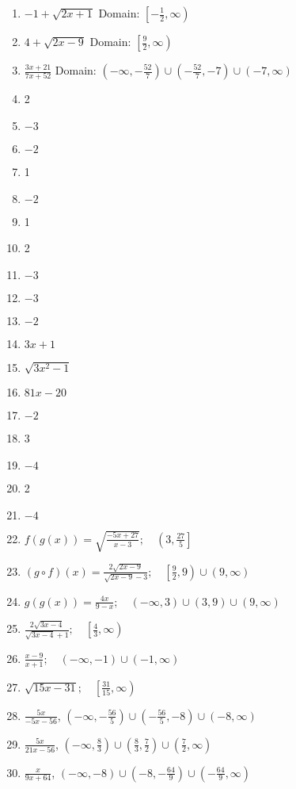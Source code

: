 \begin{enumerate}
	\item $-1 + \sqrt{2x+1}$ Domain: $\left[-\frac{1}{2}, \infty\right)$
	\item $4 + \sqrt{2x-9}$ Domain: $\left[\frac{9}{2}, \infty\right)$
	\item $\frac{3x+21}{7x+52}$ Domain: $\left(-\infty, -\frac{52}{7}\right) \cup \left(-\frac{52}{7}, -7\right) \cup (-7, \infty)$
	\item 2
     \item $-3$
     \item $-2$
     \item 1
     \item $-2$
     \item 1
     \item 2
     \item $-3$
     \item $-3$
     \item $-2$
     \item $3x + 1$
    \item $\sqrt{3x^2-1}$
    \item $81x-20$
    \item $-2$
    \item 3
    \item $-4$
    \item 2
    \item $-4$
    \item $f(g(x)) = \sqrt{\frac{-5x+27}{x-3}}; \quad \left(3, \frac{27}{5}\right]$
    \item $(g \circ f)(x) = \frac{2\sqrt{2x-9}}{\sqrt{2x-9}-3}; \quad \left[\frac{9}{2},9\right) \cup (9, \infty)$
    \item $g(g(x)) = \frac{4x}{9-x}; \quad (-\infty, 3) \cup (3, 9) \cup (9, \infty)$
    \item $\frac{2\sqrt{3x-4}}{\sqrt{3x-4}+1}; \quad  \left[\frac{4}{3}, \infty\right)$
    \item $\frac{x-9}{x+1}; \quad (-\infty, -1) \cup (-1, \infty)$
    \item $\sqrt{15x-31}; \quad \left[\frac{31}{15}, \infty\right)$
    \item $\frac{5x}{-5x-56}$, $\left(-\infty, -\frac{56}{5}\right) \cup \left(-\frac{56}{5}, -8\right) \cup (-8, \infty)$   \newline\\
	\item $\frac{5x}{21x-56}$, $\left(-\infty, \frac{8}{3}\right) \cup \left(\frac{8}{3}, \frac{7}{2}\right) \cup \left(\frac{7}{2}, \infty\right)$  \newline\\
	\item $\frac{x}{9x+64}$, $(-\infty, -8) \cup \left(-8, -\frac{64}{9}\right) \cup \left(-\frac{64}{9}, \infty\right)$
\end{enumerate}